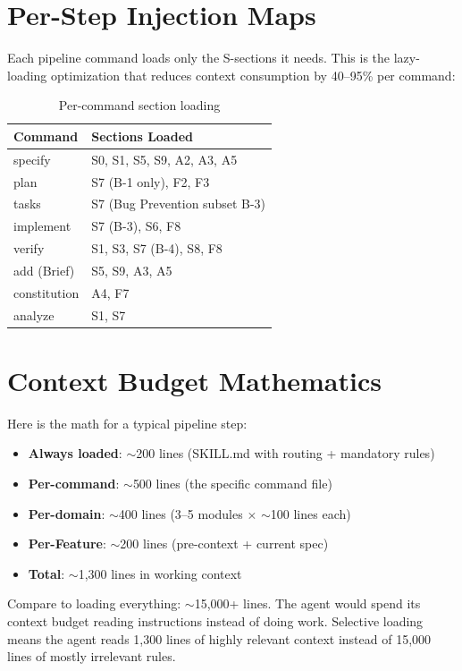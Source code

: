 \documentclass[11pt,a4paper,openright,twoside]{report}
\begin{document}
\section{Per-Step Injection Maps}
\label{sec:lazy-loading}

Each pipeline command loads only the S-sections it needs. This is the lazy-loading optimization that reduces context consumption by 40--95\% per command:

\begin{table}[H]
\centering
\caption{Per-command section loading}
\label{tab:section-loading}
\begin{tabularx}{\textwidth}{lX}
\toprule
\textbf{Command} & \textbf{Sections Loaded} \\
\midrule
specify & S0, S1, S5, S9, A2, A3, A5 \\
plan & S7 (B-1 only), F2, F3 \\
tasks & S7 (Bug Prevention subset B-3) \\
implement & S7 (B-3), S6, F8 \\
verify & S1, S3, S7 (B-4), S8, F8 \\
add (Brief) & S5, S9, A3, A5 \\
constitution & A4, F7 \\
analyze & S1, S7 \\
\bottomrule
\end{tabularx}
\end{table}

\section{Context Budget Mathematics}

Here is the math for a typical pipeline step:

\begin{itemize}
  \item \textbf{Always loaded}: $\sim$200 lines (SKILL.md with routing + mandatory rules)
  \item \textbf{Per-command}: $\sim$500 lines (the specific command file)
  \item \textbf{Per-domain}: $\sim$400 lines (3--5 modules $\times$ $\sim$100 lines each)
  \item \textbf{Per-Feature}: $\sim$200 lines (pre-context + current spec)
  \item \textbf{Total}: $\sim$1,300 lines in working context
\end{itemize}

Compare to loading everything: $\sim$15,000+ lines. The agent would spend its context budget reading instructions instead of doing work. Selective loading means the agent reads 1,300 lines of highly relevant context instead of 15,000 lines of mostly irrelevant rules.
\end{document}
